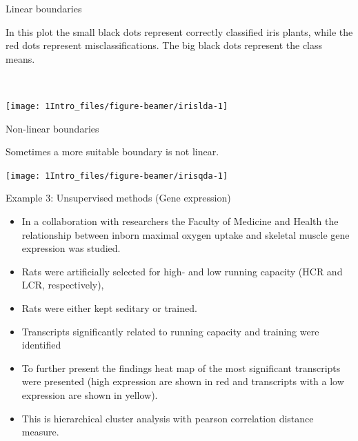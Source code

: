 \documentclass[10pt,ignorenonframetext,]{beamer}
\providecommand{\tightlist}{%
  \setlength{\itemsep}{0pt}\setlength{\parskip}{0pt}}
\begin{document}
\begin{frame}

\begin{block}{Linear boundaries}

In this plot the small black dots represent correctly classified iris
plants, while the red dots represent misclassifications. The big black
dots represent the class means.

~

\texttt{[image: 1Intro\_files/figure-beamer/irislda-1]}

\end{block}

\end{frame}

\begin{frame}

\begin{block}{Non-linear boundaries}

Sometimes a more suitable boundary is not linear.\\
\hspace*{0.333em}

\texttt{[image: 1Intro\_files/figure-beamer/irisqda-1]}

\end{block}

\end{frame}

\begin{frame}{Example 3: Unsupervised methods (Gene expression)}

\begin{itemize}
\tightlist
\item
  In a collaboration with researchers the Faculty of Medicine and Health
  the relationship between inborn maximal oxygen uptake and skeletal
  muscle gene expression was studied.
\item
  Rats were artificially selected for high- and low running capacity
  (HCR and LCR, respectively),
\item
  Rats were either kept seditary or trained.
\item
  Transcripts significantly related to running capacity and training
  were identified 
\item
  To further present the findings heat map of the most significant
  transcripts were presented (high expression are shown in red and
  transcripts with a low expression are shown in yellow).
\item
  This is hierarchical cluster analysis with pearson correlation
  distance measure.
\end{itemize}

\end{frame}
\end{document}
